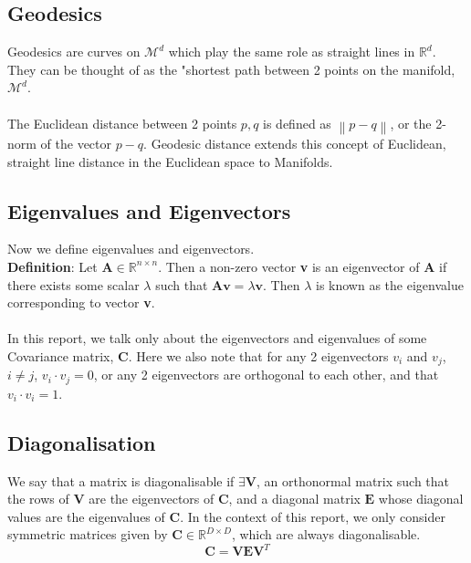 \documentclass[12pt]{report}
\newcommand\norm[1]{\left\lVert#1\right\rVert}
\begin{document}
\subsection{Geodesics}

Geodesics are curves on $\mathcal{M}^d$
which play the same role as straight
lines in $\mathbb{R}^d$. They can be thought of as the "shortest path
between 2 points on the manifold, $\mathcal{M}^d$.\\
\\

The Euclidean distance between 2 points $p, q$ 
is defined as $\norm{p-q}$, or the 2-norm of the vector $p-q$.
Geodesic distance extends this concept of Euclidean, straight line distance
in the Euclidean space to Manifolds. 


\subsection{Eigenvalues and Eigenvectors}
Now we define eigenvalues and eigenvectors.\\
\textbf{Definition}: Let $\textbf{A} \in \mathbb{R}^{n \times n}$. 
Then a non-zero vector \textbf{v} is an eigenvector of \textbf{A} 
if there exists some scalar $\lambda$ such that $\textbf{A}\textbf{v} = \lambda \textbf{v}$. 
Then $\lambda$ is known as the eigenvalue corresponding to vector \textbf{v}.\\
\\
In this report, we talk only about the eigenvectors and eigenvalues 
of some Covariance matrix, \textbf{C}.
Here we also note that for any 2 eigenvectors $v_i$ and $v_j$, $i \neq j$, $v_i \cdot v_j = 0$, 
or any 2 eigenvectors are orthogonal to each other, and that $v_i \cdot v_i = 1$.

\subsection{Diagonalisation}

We say that a matrix is diagonalisable if $\exists \textbf{V}$, 
an orthonormal matrix such that the rows of \textbf{V} 
are the eigenvectors of \textbf{C},  and a diagonal matrix 
$\textbf{E}$ whose diagonal values are the eigenvalues of \textbf{C}.
In the context of this report, we only consider 
symmetric matrices given by $\textbf{C} \in \mathbb{R}^{D \times D}$, 
which are always diagonalisable.
$$\textbf{C} = \textbf{V}\textbf{E}\textbf{V}^T$$
\end{document}
